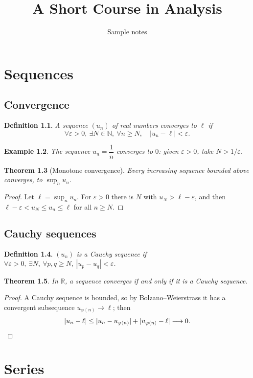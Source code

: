 \documentclass[11pt,oneside,openany]{book}
\title{\textbf{A Short Course in Analysis}}
\author{Sample notes}
\date{}
\newtheorem{theorem}{Theorem}[chapter]
\newtheorem{definition}[theorem]{Definition}
\newtheorem{example}[theorem]{Example}
\begin{document}
\maketitle
\tableofcontents
\chapter{Sequences}
\section{Convergence}
\begin{definition}
A sequence $(u_n)$ of real numbers \emph{converges} to $\ell$ if
\[ \forall \varepsilon > 0,\ \exists N \in \mathbb{N},\ \forall n \ge N,\quad |u_n - \ell| < \varepsilon. \]
\end{definition}
\begin{example} The sequence $u_n = \dfrac{1}{n}$ converges to $0$: given $\varepsilon>0$, take $N > 1/\varepsilon$. \end{example}
\begin{theorem}[Monotone convergence] Every increasing sequence bounded above converges, to $\sup_n u_n$. \end{theorem}
\begin{proof} Let $\ell = \sup_n u_n$. For $\varepsilon > 0$ there is $N$ with $u_N > \ell - \varepsilon$, and then $\ell - \varepsilon < u_N \le u_n \le \ell$ for all $n \ge N$. \end{proof}
\section{Cauchy sequences}
\begin{definition} $(u_n)$ is a \emph{Cauchy sequence} if $\forall \varepsilon>0,\ \exists N,\ \forall p,q \ge N,\ |u_p-u_q|<\varepsilon$. \end{definition}
\begin{theorem} In $\mathbb{R}$, a sequence converges if and only if it is a Cauchy sequence. \end{theorem}
\begin{proof} A Cauchy sequence is bounded, so by Bolzano--Weierstrass it has a convergent subsequence $u_{\varphi(n)} \to \ell$; then
\[ |u_n - \ell| \le |u_n - u_{\varphi(n)}| + |u_{\varphi(n)} - \ell| \longrightarrow 0. \qedhere \]
\end{proof}
\chapter{Series}
\end{document}
